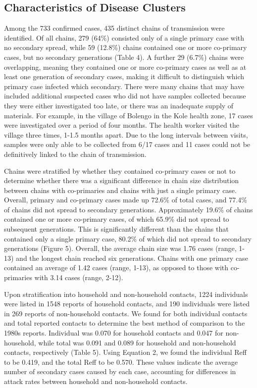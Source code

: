 \subsection{Characteristics of Disease Clusters}
Among the 733 confirmed cases, 435 distinct chains of transmission were identified. Of all chains, 279 (64\%) consisted only of a single primary case with no secondary spread, while 59 (12.8\%) chains contained one or more co-primary cases, but no secondary generations (Table 4). A further 29 (6.7\%) chains were overlapping, meaning they contained one or more co-primary cases as well as at least one generation of secondary cases, making it difficult to distinguish which primary case infected which secondary. There were many chains that may have included additional suspected cases who did not have samples collected because they were either investigated too late, or there was an inadequate supply of materials. For example, in the village of Bolengo in the Kole health zone, 17 cases were investigated over a period of four months. The health worker visited the village three times, 1-1.5 months apart. Due to the long intervals between visits, samples were only able to be collected from 6/17 cases and 11 cases could not be definitively linked to the chain of transmission.

Chains were stratified by whether they contained co-primary cases or not to determine whether there was a significant difference in chain size distribution between chains with co-primaries and chains with just a single primary case. Overall, primary and co-primary cases made up 72.6\% of total cases, and 77.4\% of chains did not spread to secondary generations. Approximately 19.6\% of chains contained one or more co-primary cases, of which 65.9\% did not spread to subsequent generations. This is significantly different than the chains that contained only a single primary case, 80.2\% of which did not spread to secondary generations (Figure 5). Overall, the average chain size was 1.76 cases (range, 1-13) and the longest chain reached six generations. Chains with one primary case contained an average of 1.42 cases (range, 1-13), as opposed to those with co-primaries with 3.14 cases (range, 2-12). 

Upon stratification into household and non-household contacts, 1224 individuals were listed in 1548 reports of household contacts, and 190 individuals were listed in 269 reports of non-household contacts. We found for both individual contacts and total reported contacts to determine the best method of comparison to the 1980s reports. Individual was 0.070 for household contacts and 0.047 for non-household, while total was 0.091 and 0.089 for household and non-household contacts, respectively (Table 5). Using Equation 2, we found the individual Reff to be 0.419, and the total Reff to be 0.570. These values indicate the average number of secondary cases caused by each case, accounting for differences in attack rates between household and non-household contacts.